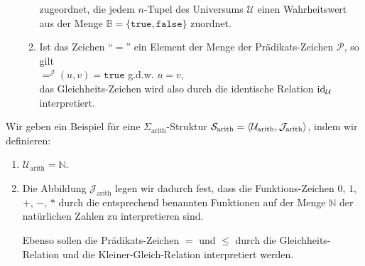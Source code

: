 \begin{Definition}[Struktur]
\begin{enumerate}
\begin{enumerate}
              zugeordnet, die jedem $n$-Tupel des Universums $\mathcal{U}$ einen Wahrheitswert aus
              der  Menge $\mathbb{B} =  \{\mathtt{true}, \mathtt{false}\}$ zuordnet.
        \item Ist das Zeichen ``$=$'' ein Element der Menge der Pr\"{a}dikats-Zeichen $\mathcal{P}$, so gilt
              \\[0.2cm]
              \hspace*{1.3cm}  
              $=^\mathcal{J}(u,v) = \mathtt{true}$ \quad g.d.w. \quad $u = v$, \\[0.2cm]
              das Gleichheits-Zeichen wird also durch die identische Relation
              $\textrm{id}_\mathcal{U}$ interpretiert. \eox
        \end{enumerate}
    \end{enumerate}
\end{Definition}

\example
Wir geben ein Beispiel f\"{u}r eine $\Sigma_{\mathrm{arith}}$-Struktur
$\mathcal{S}_{\mathrm{arith}} = \langle \mathcal{U}_{\mathrm{arith}}, \mathcal{J}_{\mathrm{arith}} \rangle$,
indem wir definieren:
\begin{enumerate}
\item $\mathcal{U}_{\mathrm{arith}} = \mathbb{N}$.
\item Die Abbildung $\mathcal{J}_{\mathrm{arith}}$ legen wir dadurch fest, dass die
      Funktions-Zeichen $0$, $1$, $\mathtt{+}$, $\mathtt{-}$, $*$
      durch die entsprechend benannten Funktionen auf der Menge $\mathbb{N}$ 
      der nat\"{u}rlichen Zahlen zu interpretieren sind.

      Ebenso sollen die Pr\"{a}dikats-Zeichen $=$ und $\leq$ durch die Gleichheits-Relation
      und die Kleiner-Gleich-Relation interpretiert werden. \eox
\end{enumerate}

